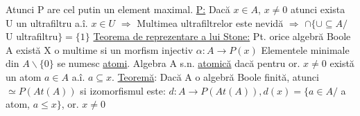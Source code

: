 \documentclass[8pt,twocolumn]{extarticle}
\begin{document}
	Atunci P are cel putin un element maximal. \newline
	\underline{P:} Dacă $x \in A$, $x \neq 0$ atunci exista U un ultrafiltru a.î. $x \in U$ \newline
	$\Rightarrow$ Multimea ultrafiltrelor este nevidă \newline
	$\Rightarrow$ $\cap \{ \cup \subseteq A / $ U ultrafiltru$\} = \{ 1\}$ \newline
	\underline{Teorema de reprezentare a lui Stone:} \newline
	Pt. orice algebră Boole A există X o multime si un morfism injectiv $\alpha : A \rightarrow P(x)$ \newline
	Elementele minimale din $A \backslash \{ 0 \}$ se numesc \underline{atomi}. Algebra A s.n. \underline{atomică} dacă pentru or. $x \neq 0$ există un atom $a \in A$ a.î. $a \subseteq x$.
	\underline{Teoremă}: Dacă A o algebră Boole finită, atunci $\simeq P(A t(A))$ si izomorfismul este: $d: A \rightarrow P(A t(A)), d(x) = \{ a \in A /$ a atom, $a \leq x \}$, or. $x \neq 0$
\end{document}
